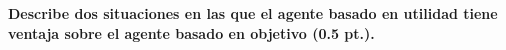 \textbf{Describe dos situaciones en las que el agente basado en utilidad tiene ventaja sobre el agente basado en objetivo (0.5 pt.).}
